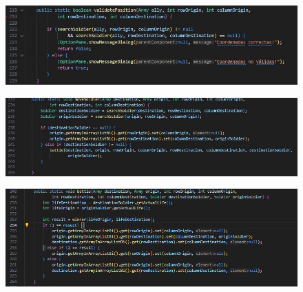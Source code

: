 \documentclass{article}
\begin{document}
	\begin{figure}[H]
		\centering
		\includegraphics[width=1\textwidth,keepaspectratio]{img/validate.jpg}
	\end{figure}
	
	
		\begin{figure}[H]
		\centering
		\includegraphics[width=1\textwidth,keepaspectratio]{img/move.jpg}
	\end{figure}
	
	
	
	\begin{figure}[H]
		\centering
		\includegraphics[width=1\textwidth,keepaspectratio]{img/battle.png}
	\end{figure}
	
	
	
\end{document}
